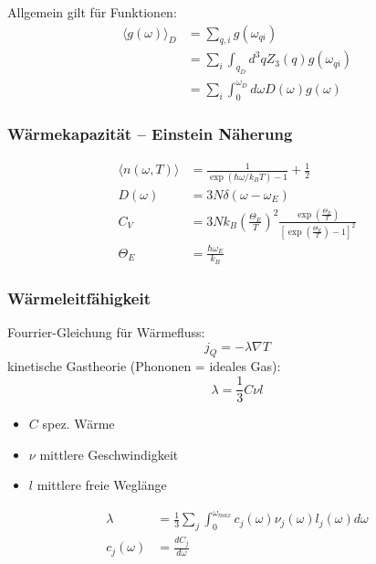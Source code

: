 Allgemein gilt für Funktionen:
\begin{equation*}
    \begin{aligned}
        \langle g(\omega) \rangle_D &= \sum_{q,i} g(\omega_{qi}) \\
           &= \sum_i \int_{q_D} d^3 q Z_3(q) g(\omega_{qi}) \\
           &= \sum_i \int_0^{\omega_D} d\omega D(\omega) g(\omega)
    \end{aligned}
\end{equation*}

\subsubsection*{Wärmekapazität – Einstein Näherung}
\begin{equation*}
    \begin{aligned}
        \langle n(\omega,T) \rangle &= \frac{1}{\exp(\hbar \omega / k_B T) -1} + \frac{1}{2}\\
        D(\omega) &= 3N \delta(\omega-\omega_E) \\
        C_V &= 3N k_B \left(\frac{\Theta_E}{T}\right)^2 \frac{\exp\left(\frac{\Theta_E}{T}\right)}{\left[\exp \left(\frac{\Theta_E}{T}\right)-1\right]^2} \\
        \Theta_E &= \frac{\hbar \omega_E}{k_B}
    \end{aligned}
\end{equation*}

\subsubsection*{Wärmeleitfähigkeit}
Fourrier-Gleichung für Wärmefluss:
\begin{equation*}
    j_Q = - \lambda \nabla T
\end{equation*}
kinetische Gastheorie (Phononen = ideales Gas):
\begin{equation*}
    \lambda = \frac{1}{3} C \nu l
\end{equation*}

\begin{itemize}
    \itemsep 0pt
    \item $C$ spez. Wärme
    \item $\nu$ mittlere Geschwindigkeit 
    \item $l$ mittlere freie Weglänge
\end{itemize}

\begin{equation*}
    \begin{aligned}
        \lambda &= \frac{1}{3} \sum_j \int_0^{\omega_{max}} c_j(\omega) \nu_j(\omega) l_j(\omega) d\omega \\
        c_j(\omega) &= \frac{dC_j}{d\omega}
    \end{aligned}
\end{equation*}

